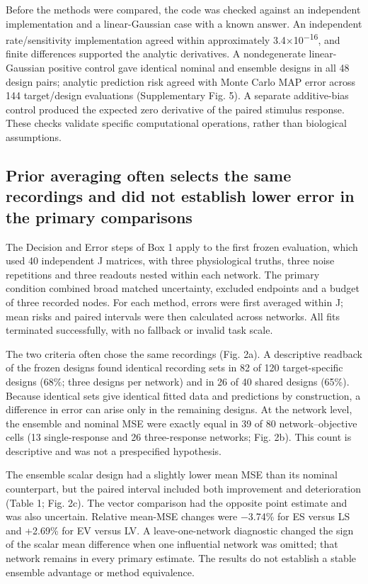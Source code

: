 Before the methods were compared, the code was checked against an independent implementation and a linear-Gaussian case with a known answer. An independent rate/sensitivity implementation agreed within approximately 3.4×10\textsuperscript{−16}, and finite differences supported the analytic derivatives. A nondegenerate linear-Gaussian positive control gave identical nominal and ensemble designs in all 48 design pairs; analytic prediction risk agreed with Monte Carlo MAP error across 144 target/design evaluations (Supplementary Fig. 5). A separate additive-bias control produced the expected zero derivative of the paired stimulus response. These checks validate specific computational operations, rather than biological assumptions.

\subsection{Prior averaging often selects the same recordings and did not establish lower error in the primary comparisons}

The Decision and Error steps of Box 1 apply to the first frozen evaluation, which used 40 independent J matrices, with three physiological truths, three noise repetitions and three readouts nested within each network. The primary condition combined broad matched uncertainty, excluded endpoints and a budget of three recorded nodes. For each method, errors were first averaged within J; mean risks and paired intervals were then calculated across networks. All fits terminated successfully, with no fallback or invalid task scale.

The two criteria often chose the same recordings (Fig. 2a). A descriptive readback of the frozen designs found identical recording sets in 82 of 120 target-specific designs (68\%; three designs per network) and in 26 of 40 shared designs (65\%). Because identical sets give identical fitted data and predictions by construction, a difference in error can arise only in the remaining designs. At the network level, the ensemble and nominal MSE were exactly equal in 39 of 80 network--objective cells (13 single-response and 26 three-response networks; Fig. 2b). This count is descriptive and was not a prespecified hypothesis.

The ensemble scalar design had a slightly lower mean MSE than its nominal counterpart, but the paired interval included both improvement and deterioration (Table 1; Fig. 2c). The vector comparison had the opposite point estimate and was also uncertain. Relative mean-MSE changes were −3.74\% for ES versus LS and +2.69\% for EV versus LV. A leave-one-network diagnostic changed the sign of the scalar mean difference when one influential network was omitted; that network remains in every primary estimate. The results do not establish a stable ensemble advantage or method equivalence.

